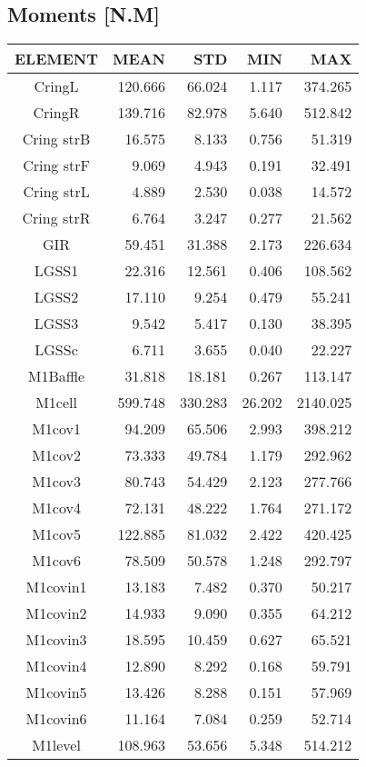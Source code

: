 \subsection{Moments [N.M]}
\begin{longtable}{crrrr}\toprule
 ELEMENT & MEAN & STD & MIN & MAX \\\hline
 CringL & 120.666 & 66.024 & 1.117 & 374.265 \\
 CringR & 139.716 & 82.978 & 5.640 & 512.842 \\
 Cring strB & 16.575 & 8.133 & 0.756 & 51.319 \\
 Cring strF & 9.069 & 4.943 & 0.191 & 32.491 \\
 Cring strL & 4.889 & 2.530 & 0.038 & 14.572 \\
 Cring strR & 6.764 & 3.247 & 0.277 & 21.562 \\
 GIR & 59.451 & 31.388 & 2.173 & 226.634 \\
 LGSS1 & 22.316 & 12.561 & 0.406 & 108.562 \\
 LGSS2 & 17.110 & 9.254 & 0.479 & 55.241 \\
 LGSS3 & 9.542 & 5.417 & 0.130 & 38.395 \\
 LGSSc & 6.711 & 3.655 & 0.040 & 22.227 \\
 M1Baffle & 31.818 & 18.181 & 0.267 & 113.147 \\
 M1cell & 599.748 & 330.283 & 26.202 & 2140.025 \\
 M1cov1 & 94.209 & 65.506 & 2.993 & 398.212 \\
 M1cov2 & 73.333 & 49.784 & 1.179 & 292.962 \\
 M1cov3 & 80.743 & 54.429 & 2.123 & 277.766 \\
 M1cov4 & 72.131 & 48.222 & 1.764 & 271.172 \\
 M1cov5 & 122.885 & 81.032 & 2.422 & 420.425 \\
 M1cov6 & 78.509 & 50.578 & 1.248 & 292.797 \\
 M1covin1 & 13.183 & 7.482 & 0.370 & 50.217 \\
 M1covin2 & 14.933 & 9.090 & 0.355 & 64.212 \\
 M1covin3 & 18.595 & 10.459 & 0.627 & 65.521 \\
 M1covin4 & 12.890 & 8.292 & 0.168 & 59.791 \\
 M1covin5 & 13.426 & 8.288 & 0.151 & 57.969 \\
 M1covin6 & 11.164 & 7.084 & 0.259 & 52.714 \\
 M1level & 108.963 & 53.656 & 5.348 & 514.212 \\

\end{longtable}
